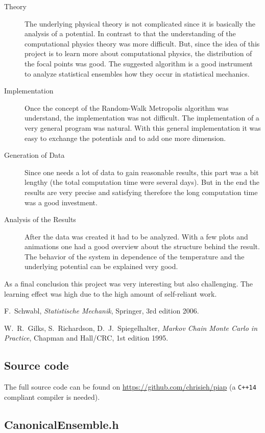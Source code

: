\documentclass[11pt, a4paper]{article}
\numberwithin{equation}{section}
\begin{document}
\begin{description}
\item[Theory]
The underlying physical theory is not complicated since it is basically the analysis of a potential.
In contrast to that the understanding of the computational physics theory was more difficult.
But, since the idea of this project is to learn more about computational physics, the distribution of the focal points was good.
The suggested algorithm is a good instrument to analyze statistical ensembles how they occur in statistical mechanics.

\item[Implementation]
Once the concept of the Random-Walk Metropolis algorithm was understand, the implementation was not difficult.
The implementation of a very general program was natural.
With this general implementation it was easy to exchange the potentials and to add one more dimension.

\item[Generation of Data]
Since one needs a lot of data to gain reasonable results, this part was a bit lengthy (the total computation time were several days).
But in the end the results are very precise and satisfying therefore the long computation time was a good investment.

\item[Analysis of the Results]
After the data was created it had to be analyzed.
With a few plots and animations one had a good overview about the structure behind the result.
The behavior of the system in dependence of the temperature and the underlying potential can be explained very good.
\end{description}

As a final conclusion this project was very interesting but also challenging.
The learning effect was high due to the high amount of self-reliant work.

\FloatBarrier
\vspace{\fill}
\begin{thebibliography}{9}
	F.\ Schwabl,
	\emph{Statistische Mechanik},
	Springer, 3rd edition 2006.

	W.\ R.\ Gilks, S.\ Richardson, D.\ J.\ Spiegelhalter,
	\emph{Markov Chain Monte Carlo in Practice},
	Chapman and Hall/CRC, 1st edition 1995.
\end{thebibliography}

\begin{appendix}
	\newpage
	\section{Source code}
	The full source code can be found on \url{https://github.com/chrisieh/piap} (a \texttt{C++14} compliant compiler is needed).
	\subsection{CanonicalEnsemble{.}h} \label{sec:canonical_ensemble_source}
	
\end{appendix}
\end{document}
